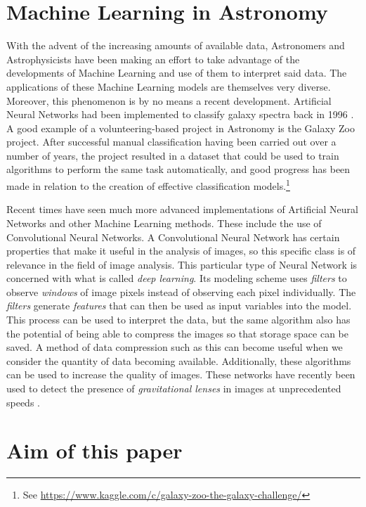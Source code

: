 \documentclass[a4paper, 12pt]{report}
\theoremstyle{definition}
\begin{document}
\section{Machine Learning in Astronomy}

With the advent of the increasing amounts of available data, Astronomers and Astrophysicists have been making an effort to take advantage of the developments of Machine Learning and use of them to interpret said data. The applications of these Machine Learning models are themselves very diverse. Moreover, this phenomenon is by no means a recent development. Artificial Neural Networks had been implemented to classify galaxy spectra back in 1996 \autocite{ANNGalaxySpectra1996}. A good example of a volunteering-based project in Astronomy is the Galaxy Zoo project. \autocite{galzoo} After successful manual classification having been carried out over a number of years, the project resulted in a dataset that could be used to train algorithms to perform the same task automatically, and good progress has been made in relation to the creation of effective classification models.\footnote{See \url{https://www.kaggle.com/c/galaxy-zoo-the-galaxy-challenge/}}

Recent times have seen much more advanced implementations of Artificial Neural Networks and other Machine Learning methods. These include the use of Convolutional Neural Networks. A Convolutional Neural Network has certain properties that make it useful in the analysis of images, so this specific class is of relevance in the field of image analysis. This particular type of Neural Network is concerned with what is called \textit{deep learning}. Its modeling scheme uses \textit{filters} to observe \textit{windows} of image pixels instead of observing each pixel individually. The \textit{filters} generate \textit{features} that can then be used as input variables into the model. This process can be used to interpret the data, but the same algorithm also has the potential of being able to compress the images so that storage space can be saved. A method of data compression such as this can become useful when we consider the quantity of data becoming available. Additionally, these algorithms can be used to increase the quality of images. These networks have recently been used to detect the presence of \textit{gravitational lenses} in images at unprecedented speeds \autocite{Hezaveh2017}. 

\section{Aim of this paper}
\end{document}
